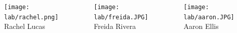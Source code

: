 \begin{frame}[c]{}
\begin{columns}[t]
\begin{column}[T]{3.5in}
\begin{columns}[t]
			
				\begin{column}[T]{1in}
					{\centering
						\texttt{[image: lab/rachel.png]} \\
						\vspace{-.1in}
						{\tiny Rachel Lucas} \\
						\par
					}
				\end{column}
			
				\begin{column}[T]{1in}
					{\centering
						\texttt{[image: lab/freida.JPG]} \\
						\vspace{-.1in}
						{\tiny Freida Rivera} \\
						\par
					}
				\end{column}
			
				\begin{column}[T]{1in}
					{\centering
						\texttt{[image: lab/aaron.JPG]} \\
						\vspace{-.1in}
						{\tiny Aaron Ellis} \\
						\par
					}
				\end{column}
				
				
			\end{columns}
		\end{column}


	\end{columns}

	
	
\end{frame}



